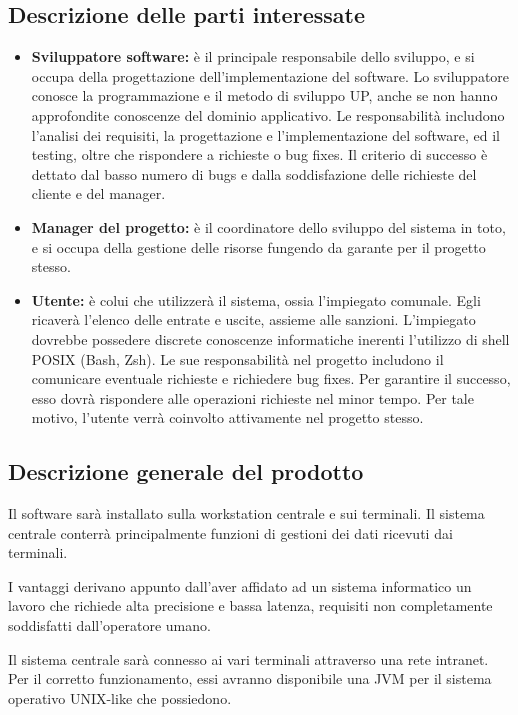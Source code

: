 \documentclass[12pt, letterpaper]{article}
\begin{document}
\subsection{Descrizione delle parti interessate}
\begin{itemize}
    \item \textbf{Sviluppatore software:} è il principale responsabile dello sviluppo, e si occupa della progettazione dell'implementazione del software. Lo sviluppatore conosce la programmazione e il metodo di sviluppo UP, anche se non hanno approfondite conoscenze del dominio applicativo. Le responsabilità includono l'analisi dei requisiti, la progettazione e l'implementazione del software, ed il testing, oltre che rispondere a richieste o bug fixes. Il criterio di successo è dettato dal basso numero di bugs e dalla soddisfazione delle richieste del cliente e del manager.
    \item \textbf{Manager del progetto:} è il coordinatore dello sviluppo del sistema in toto, e si occupa della gestione delle risorse fungendo da garante per il progetto stesso.
    \item \textbf{Utente:} è colui che utilizzerà il sistema, ossia l'impiegato comunale. Egli ricaverà l'elenco delle entrate e uscite, assieme alle sanzioni. L'impiegato dovrebbe possedere discrete conoscenze informatiche inerenti l'utilizzo di shell POSIX (Bash, Zsh). Le sue responsabilità nel progetto includono il comunicare eventuale richieste e richiedere bug fixes. Per garantire il successo, esso dovrà rispondere alle operazioni richieste nel minor tempo. Per tale motivo, l'utente verrà coinvolto attivamente nel progetto stesso.
\end{itemize}

\subsection{Descrizione generale del prodotto}
Il software sarà installato sulla workstation centrale e sui terminali. Il sistema centrale conterrà principalmente funzioni di gestioni dei dati ricevuti dai terminali.

I vantaggi derivano appunto dall'aver affidato ad un sistema informatico un lavoro che richiede alta precisione e bassa latenza, requisiti non completamente soddisfatti dall'operatore umano.

Il sistema centrale sarà connesso ai vari terminali attraverso una rete intranet. Per il corretto funzionamento, essi avranno disponibile una JVM per il sistema operativo UNIX-like che possiedono.
\end{document}
